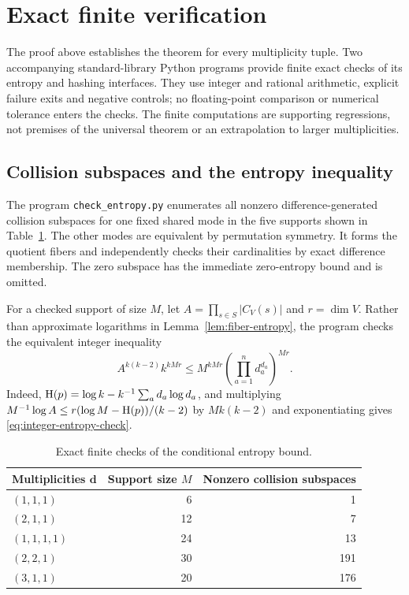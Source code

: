 \section{Exact finite verification}\label{sec:verification}

The proof above establishes the theorem for every multiplicity tuple.
Two accompanying standard-library Python programs provide finite exact
checks of its entropy and hashing interfaces. They use integer and
rational arithmetic, explicit failure exits and negative controls;
no floating-point comparison or numerical tolerance enters the checks.
The finite computations are supporting regressions, not premises of
the universal theorem or an extrapolation to larger multiplicities.

\subsection{Collision subspaces and the entropy inequality}

The program \texttt{check\_entropy.py} enumerates all nonzero
difference-generated collision subspaces for one fixed shared mode
in the five supports shown in Table~\ref{tab:entropy-checks}. The
other modes are equivalent by permutation symmetry. It forms the
quotient fibers and independently checks their cardinalities by exact
difference membership. The zero subspace has the immediate zero-entropy
bound and is omitted.

For a checked support of size $M$, let
$A=\prod_{s\in S}|C_V(s)|$ and $r=\dim V$. Rather than approximate
logarithms in Lemma~\ref{lem:fiber-entropy}, the program checks the
equivalent integer inequality
\begin{equation}\label{eq:integer-entropy-check}
 A^{k(k-2)}k^{kMr}
    \leq M^{kMr}\left(\prod_{a=1}^n d_a^{d_a}\right)^{Mr}.
\end{equation}
Indeed, $\operatorname{H}(p)=\log k-k^{-1}\sum_a d_a\log d_a$, and multiplying
$M^{-1}\log A\leq r(\log M-\operatorname{H}(p))/(k-2)$ by $Mk(k-2)$ and
exponentiating gives \eqref{eq:integer-entropy-check}.

\begin{table}[htbp]
\centering
\begin{tabular}{lrr}
\toprule
Multiplicities $\mathbf d$ & Support size $M$ & Nonzero collision subspaces\\
\midrule
$(1,1,1)$ & 6 & 1\\
$(2,1,1)$ & 12 & 7\\
$(1,1,1,1)$ & 24 & 13\\
$(2,2,1)$ & 30 & 191\\
$(3,1,1)$ & 20 & 176\\
\bottomrule
\end{tabular}
\caption{Exact finite checks of the conditional entropy bound.}
\label{tab:entropy-checks}
\end{table}


